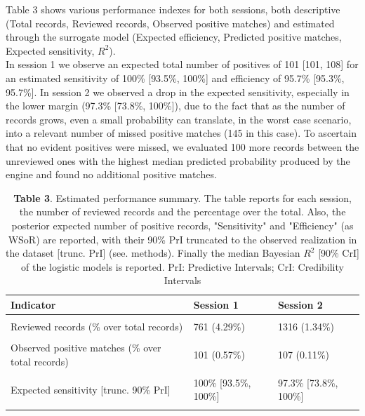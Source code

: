 \documentclass{article}
\begin{document}
Table 3 shows various performance indexes for both sessions, both
descriptive (Total records, Reviewed records, Observed positive matches)
and estimated through the surrogate model (Expected efficiency,
Predicted positive matches, Expected sensitivity, \(R^2\)).\\
In session 1 we observe an expected total number of positives of 101
{[}101, 108{]} for an estimated sensitivity of 100\% {[}93.5\%, 100\%{]}
and efficiency of 95.7\% {[}95.3\%, 95.7\%{]}. In session 2 we observed
a drop in the expected sensitivity, especially in the lower margin
(97.3\% {[}73.8\%, 100\%{]}), due to the fact that as the number of
records grows, even a small probability can translate, in the worst case
scenario, into a relevant number of missed positive matches (145 in this
case). To ascertain that no evident positives were missed, we evaluated
100 more records between the unreviewed ones with the highest median
predicted probability produced by the engine and found no additional
positive matches.\\

\begin{table}[!h]

\caption{\label{tab:Table 3}\textbf{Table 3}. Estimated performance summary. The table reports for each session, the number of reviewed records and the percentage over the total. Also, the posterior expected number of positive records, "Sensitivity" and "Efficiency" (as WSoR) are reported, with their 90\% PrI truncated to the observed realization in the dataset [trunc. PrI] (see. methods). Finally the median Bayesian $R^2$ [90\% CrI] of the logistic models is reported. PrI: Predictive Intervals; CrI: Credibility Intervals}
\centering
\begin{tabular}[t]{lll}
\toprule
Indicator & Session 1 & Session 2\\
\midrule
\cellcolor{gray!6}{Total records} & \cellcolor{gray!6}{17755} & \cellcolor{gray!6}{98371}\\
Reviewed records (\% over total records) & 761 (4.29\%) & 1316 (1.34\%)\\
\cellcolor{gray!6}{Expected efficiency (over random) [trunc. 90\% PrI]} & \cellcolor{gray!6}{95.7\% [95.3\%, 95.7\%]} & \cellcolor{gray!6}{98.6\% [98.2\%, 98.7\%]}\\
Observed positive matches (\% over total records) & 101 (0.57\%) & 107 (0.11\%)\\
\cellcolor{gray!6}{Predicted positive matches [trunc. 90\% PrI]} & \cellcolor{gray!6}{101 [101, 108]} & \cellcolor{gray!6}{110 [107, 145]}\\
\addlinespace
Expected sensitivity [trunc. 90\% PrI] & 100\% [93.5\%, 100\%] & 97.3\% [73.8\%, 100\%]\\
\cellcolor{gray!6}{Simple Model $R^2$ [90\% CrI]} & \cellcolor{gray!6}{98.1\% [97.4\%, 98.3\%]} & \cellcolor{gray!6}{98.2\% [97.6\%, 98.3\%]}\\
\bottomrule
\end{tabular}
\end{table}
\end{document}
